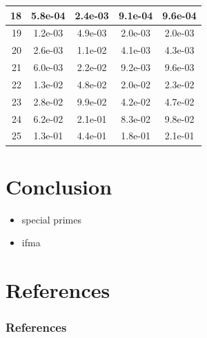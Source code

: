 \documentclass[10pt]{beamer}
\begin{document}
\begin{frame}
\begin{center}
{\begin{tabular}{|r|*{4}{c|}}
            \hline
            \cellcolor{myGray} 18 & 5.8e-04 & 2.4e-03 & 9.1e-04 & 9.6e-04 \\
            \hline
            \cellcolor{myGray} 19 & 1.2e-03 & 4.9e-03 & 2.0e-03 & 2.0e-03 \\
            \hline
            \cellcolor{myGray} 20 & 2.6e-03 & 1.1e-02 & 4.1e-03 & 4.3e-03 \\
            \hline
            \cellcolor{myGray} 21 & 6.0e-03 & 2.2e-02 & 9.2e-03 & 9.6e-03 \\
            \hline
            \cellcolor{myGray} 22 & 1.3e-02 & 4.8e-02 & 2.0e-02 & 2.3e-02 \\
            \hline
            \cellcolor{myGray} 23 & 2.8e-02 & 9.9e-02 & 4.2e-02 & 4.7e-02 \\
            \hline
            \cellcolor{myGray} 24 & 6.2e-02 & 2.1e-01 & 8.3e-02 & 9.8e-02 \\
            \hline
            \cellcolor{myGray} 25 & 1.3e-01 & 4.4e-01 & 1.8e-01 & 2.1e-01 \\
            \hline
        \end{tabular}
        }
    \end{center}
\end{frame}

\section{Conclusion}
\begin{frame}
    \begin{itemize}
        \item special primes
        \item ifma
    \end{itemize}
\end{frame}

\section{References}
\begin{frame}
    \frametitle{References}

     
     
    \nocite{*}
\end{frame}
\end{document}
